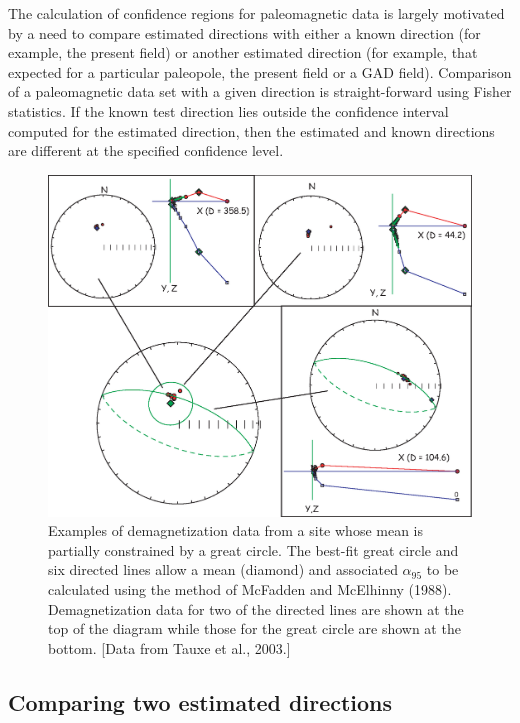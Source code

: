 The calculation of confidence regions for paleomagnetic
data is largely motivated by a need to compare  estimated directions with
either a known direction (for example, the present field) or another estimated
direction (for example, that expected for a particular paleopole, the present field or a GAD field). 
Comparison of a paleomagnetic data set with a given direction is  
straight-forward using Fisher statistics. 
 If the known test direction lies outside the
confidence interval computed for the estimated direction, then the estimated and
known directions are different at the specified confidence level. 

\begin{figure}[h!tb]
\centering  \includegraphics[width= 14 cm]{EPSfiles/lnp.eps}
\caption{
Examples of demagnetization data from a site whose mean is partially
constrained by  a great circle. 
 The best-fit great
circle and six directed lines allow a mean (diamond) and 
associated $\alpha_{95}$ to
be calculated using the method of 
McFadden and 
McElhinny (1988).   Demagnetization data for two of the directed lines are shown at the top of the diagram while those for the great circle are shown at the bottom.  [Data from Tauxe et al., 2003.]  
}
\label{fig:lnp}
\end{figure} \nocite{tauxe03b}

\subsection {Comparing two estimated directions}

